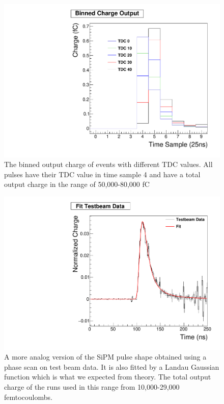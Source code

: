 \begin{figure}
\centering
\includegraphics[width=0.6\linewidth]{Figures/Phase.pdf}
\caption{The binned output charge of events with different TDC values. All pulses have their TDC value in time sample 4 and have a total output charge in the range of 50,000-80,000 fC}
\label{fig:Phase}
\end{figure}

\begin{figure}
\centering
\includegraphics[width=0.6\linewidth]{Figures/FittedPlot.pdf}
\caption{A more analog version of the SiPM pulse shape obtained using a phase scan on test beam data. It is also fitted by a Landau Gaussian function which is what we expected from theory. The total output charge of the runs used in this range from 10,000-29,000 femtocoulombs.}
\label{fig:fit}
\end{figure}


